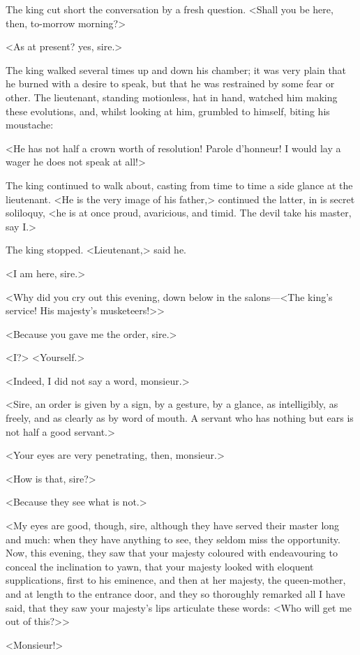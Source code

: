 The king cut short the conversation by a fresh question. <Shall you be here, then, to-morrow morning?>

<As at present? yes, sire.>

The king walked several times up and down his chamber; it was very plain that he burned with a desire to speak, but that he was restrained by some fear or other. The lieutenant, standing motionless, hat in hand, watched him making these evolutions, and, whilst looking at him, grumbled to himself, biting his moustache:

<He has not half a crown worth of resolution! Parole d'honneur! I would lay a wager he does not speak at all!>

The king continued to walk about, casting from time to time a side glance at the lieutenant. <He is the very image of his father,> continued the latter, in is secret soliloquy, <he is at once proud, avaricious, and timid. The devil take his master, say I\@.>

The king stopped. <Lieutenant,> said he.

<I am here, sire.>

<Why did you cry out this evening, down below in the salons—<The king's service! His majesty's musketeers!>>

<Because you gave me the order, sire.>

<I\@?> <Yourself.>

<Indeed, I did not say a word, monsieur.>

<Sire, an order is given by a sign, by a gesture, by a glance, as intelligibly, as freely, and as clearly as by word of mouth. A servant who has nothing but ears is not half a good servant.>

<Your eyes are very penetrating, then, monsieur.>

<How is that, sire?>

<Because they see what is not.>

<My eyes are good, though, sire, although they have served their master long and much: when they have anything to see, they seldom miss the opportunity. Now, this evening, they saw that your majesty coloured with endeavouring to conceal the inclination to yawn, that your majesty looked with eloquent supplications, first to his eminence, and then at her majesty, the queen-mother, and at length to the entrance door, and they so thoroughly remarked all I have said, that they saw your majesty's lips articulate these words: <Who will get me out of this?>>

<Monsieur!>

